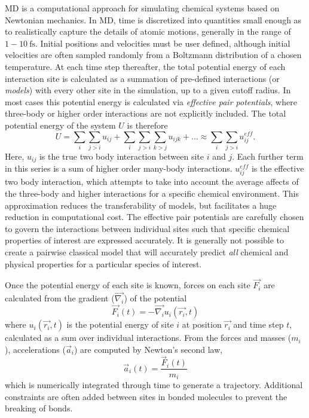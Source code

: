 \documentclass[titlepage,11pt]{article}
\begin{document}
MD is a computational approach for simulating chemical systems based on Newtonian mechanics. In MD, time is discretized into quantities small enough as to realistically capture the details of atomic motions, generally in the range of $1 - \SI{10}{\femto\second}$. Initial positions and velocities must be user defined, although initial velocities are often sampled randomly from a Boltzmann distribution of a chosen temperature. At each time step thereafter, the total potential energy of each interaction site is calculated as a summation of pre-defined interactions (or \textit{models}) with every other site in the simulation, up to a given cutoff radius. In most cases this potential energy is calculated via \textit{effective pair potentials}, where three-body or higher order interactions are not explicitly included. The total potential energy of the system $U$ is therefore
\begin{equation}
	U = \sum_{i} \sum_{j>i} u_{ij} + \sum_{i}\sum_{j>i} \sum_{k>j} u_{ijk} + \ldots \approx \sum_{i}\sum_{j>i} u^{eff}_{ij}.
\end{equation}
Here, $u_{ij}$ is the true two body interaction between site $i$ and $j$. Each further term in this series is a sum of higher order many-body interactions. $u_{ij}^{eff}$ is the effective two body interaction, which attempts to take into account the average affects of the three-body and higher interactions for a specific chemical environment. This approximation reduces the transferability of models, but facilitates a huge reduction in computational cost. The effective pair potentials are carefully chosen to govern the interactions between individual sites such that specific chemical properties of interest are expressed accurately. It is generally not possible to create a pairwise classical model that will accurately predict \textit{all} chemical and physical properties for a particular species of interest. 

Once the potential energy of each site is known, forces on each site $\vec{F_{i}}$ are calculated from the gradient ($\vec{\nabla_{i}}$) of the potential
\begin{equation}
	\vec{F_{i}}(t) = - \vec{\nabla_{i}} u_{i}(\vec{r_{i}},t)
\end{equation}
where $u_{i}(\vec{r_{i}},t)$ is the potential energy of site $i$ at position $\vec{r_{i}}$ and time step $t$, calculated as a sum over individual interactions. From the forces and masses ($m _ { i }$), accelerations ($\vec { a } _ { i }$) are computed by Newton's second law,
\begin{equation}
	\vec { a } _ { i } ( t ) = \frac { \vec { F } _ { i } ( t ) } { m _ { i } }
\end{equation}
which is numerically integrated through time to generate a trajectory. Additional constraints are often added between sites in bonded molecules to prevent the breaking of bonds.
\end{document}
